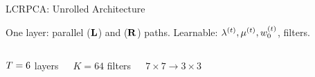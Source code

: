 \begin{frame}{LCRPCA: Unrolled Architecture}
  \begin{center}
  \small
  
  \end{center}

  \vspace{0.15em}
  \begin{shibuiframe}{ }
    \small\centering
    One layer: parallel  ($\mathbf{L}$) and  ($\mathbf{R}$) paths.
    Learnable: $\lambda^{(t)}, \mu^{(t)}, w_0^{(t)}$, filters.
  \end{shibuiframe}

  \vspace{0.3em}
  \begin{columns}[T]
      \small\centering
      $T = 6$ layers

      \small\centering
      $K = 64$ filters

      \small\centering
      $7{\times}7 \to 3{\times}3$
  \end{columns}
\end{frame}

